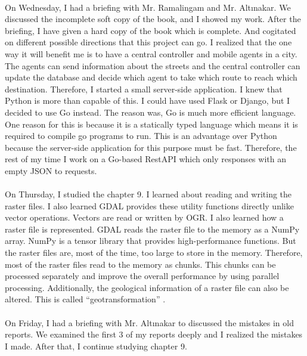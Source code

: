 \documentclass[a4paper]{article}
\begin{document}
\paragraph{}
On Wednesday, I had a briefing with Mr. Ramalingam and Mr. Altınakar. We discussed the incomplete soft copy of the book, and I showed my work. After the briefing, I have given a hard copy of the book which is complete. And cogitated on different possible directions that this project can go. I realized that the one way it will benefit me is to have a central controller and mobile agents in a city. The agents can send information about the streets and the central controller can update the database and decide which agent to take which route to reach which destination. Therefore, I started a small server-side application. I knew that Python is more than capable of this. I could have used Flask or Django, but I decided to use Go instead. The reason was, Go is much more efficient language. One reason for this is because it is a statically typed language which means it is required to compile go programs to run\cite{go}. This is an advantage over Python because the server-side application for this purpose must be fast. Therefore, the rest of my time I work on a Go-based RestAPI which only responses with an empty JSON to requests.

\paragraph{}
On Thursday, I studied the chapter 9. I learned about reading and writing the raster files. I also learned GDAL provides these utility functions directly unlike vector operations. Vectors are read or written by OGR. I also learned how a raster file is represented. GDAL reads the raster file to the memory as a NumPy array. NumPy is a tensor library that provides high-performance functions\cite{numpy}. But the raster files are, most of the time, too large to store in the memory. Therefore, most of the raster files read to the memory as chunks. This chunks can be processed separately and improve the overall performance by using parallel processing. Additionally, the geological information of a raster file can also be altered. This is called “geotransformation” \cite{geotransformation}.

\paragraph{}
On Friday, I had a briefing with Mr. Altınakar to discussed the mistakes in old reports. We examined the first 3 of my reports deeply and I realized the mistakes I made. After that, I continue studying chapter 9.
\end{document}
